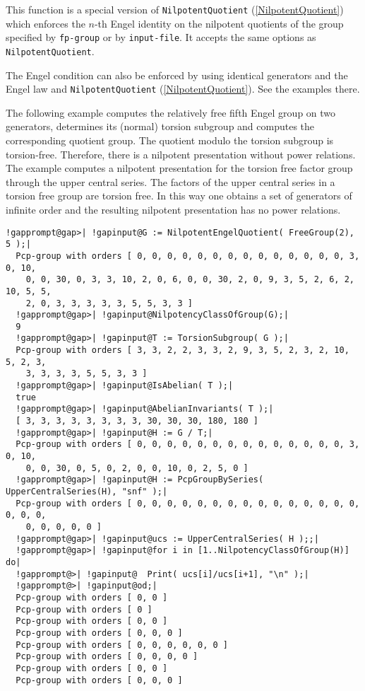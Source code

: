 \documentclass[a4paper,11pt]{report}
\begin{document}
{{{ This function is a special version of \texttt{NilpotentQuotient} (\ref{NilpotentQuotient}) which enforces the $n$-th Engel identity on the nilpotent quotients of the group specified by \texttt{fp-group} or by \texttt{input-file}. It accepts the same options as \texttt{NilpotentQuotient}. 

The Engel condition can also be enforced by using identical generators and the
Engel law and \texttt{NilpotentQuotient} (\ref{NilpotentQuotient}). See the examples there. 

 The following example computes the relatively free fifth Engel group on two
generators, determines its (normal) torsion subgroup and computes the
corresponding quotient group. The quotient modulo the torsion subgroup is
torsion-free. Therefore, there is a nilpotent presentation without power
relations. The example computes a nilpotent presentation for the torsion free
factor group through the upper central series. The factors of the upper
central series in a torsion free group are torsion free. In this way one
obtains a set of generators of infinite order and the resulting nilpotent
presentation has no power relations. 
\begin{Verbatim}[commandchars=!@|,fontsize=\small,frame=single,label=Example]
  !gapprompt@gap>| !gapinput@G := NilpotentEngelQuotient( FreeGroup(2), 5 );|
  Pcp-group with orders [ 0, 0, 0, 0, 0, 0, 0, 0, 0, 0, 0, 0, 0, 0, 3, 0, 10, 
    0, 0, 30, 0, 3, 3, 10, 2, 0, 6, 0, 0, 30, 2, 0, 9, 3, 5, 2, 6, 2, 10, 5, 5, 
    2, 0, 3, 3, 3, 3, 3, 5, 5, 3, 3 ]
  !gapprompt@gap>| !gapinput@NilpotencyClassOfGroup(G);|
  9
  !gapprompt@gap>| !gapinput@T := TorsionSubgroup( G );|
  Pcp-group with orders [ 3, 3, 2, 2, 3, 3, 2, 9, 3, 5, 2, 3, 2, 10, 5, 2, 3, 
    3, 3, 3, 3, 5, 5, 3, 3 ]
  !gapprompt@gap>| !gapinput@IsAbelian( T );|
  true
  !gapprompt@gap>| !gapinput@AbelianInvariants( T );|
  [ 3, 3, 3, 3, 3, 3, 3, 3, 30, 30, 30, 180, 180 ]
  !gapprompt@gap>| !gapinput@H := G / T;|
  Pcp-group with orders [ 0, 0, 0, 0, 0, 0, 0, 0, 0, 0, 0, 0, 0, 0, 3, 0, 10, 
    0, 0, 30, 0, 5, 0, 2, 0, 0, 10, 0, 2, 5, 0 ]
  !gapprompt@gap>| !gapinput@H := PcpGroupBySeries( UpperCentralSeries(H), "snf" );|
  Pcp-group with orders [ 0, 0, 0, 0, 0, 0, 0, 0, 0, 0, 0, 0, 0, 0, 0, 0, 0, 0, 
    0, 0, 0, 0, 0 ]
  !gapprompt@gap>| !gapinput@ucs := UpperCentralSeries( H );;|
  !gapprompt@gap>| !gapinput@for i in [1..NilpotencyClassOfGroup(H)] do|
  !gapprompt@>| !gapinput@	Print( ucs[i]/ucs[i+1], "\n" );|
  !gapprompt@>| !gapinput@od;|
  Pcp-group with orders [ 0, 0 ]
  Pcp-group with orders [ 0 ]
  Pcp-group with orders [ 0, 0 ]
  Pcp-group with orders [ 0, 0, 0 ]
  Pcp-group with orders [ 0, 0, 0, 0, 0, 0 ]
  Pcp-group with orders [ 0, 0, 0, 0 ]
  Pcp-group with orders [ 0, 0 ]
  Pcp-group with orders [ 0, 0, 0 ]
\end{Verbatim}
 }

}}
\end{document}
